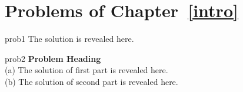 
\section*{Problems of Chapter~\ref{intro}}

\begin{sol}{prob1}
The solution is revealed here.
\end{sol}


\begin{sol}{prob2}
\textbf{Problem Heading}\\
(a) The solution of first part is revealed here.\\
(b) The solution of second part is revealed here.
\end{sol}

